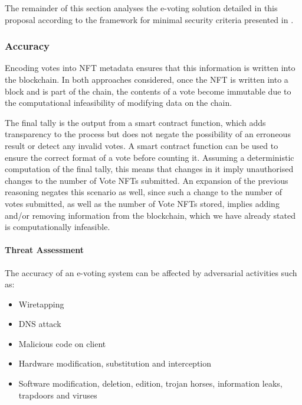 \documentclass[../main.tex]{subfiles}
\begin{document}
        The remainder of this section analyses the e-voting solution detailed in this proposal according to the framework for minimal security criteria presented in \cite{Almeida2023}.

        \subsubsection{Accuracy}
            Encoding votes into NFT metadata ensures that this information is written into the blockchain. In both approaches considered, once the NFT is written into a block and is part of the chain, the contents of a vote become immutable due to the computational infeasibility of modifying data on the chain.
            \par
            The final tally is the output from a smart contract function, which adds transparency to the process but does not negate the possibility of an erroneous result or detect any invalid votes. A smart contract function can be used to ensure the correct format of a vote before counting it. Assuming a deterministic computation of the final tally, this means that changes in it imply unauthorised changes to the number of Vote NFTs submitted. An expansion of the previous reasoning negates this scenario as well, since such a change to the number of votes submitted, as well as the number of Vote NFTs stored, implies adding and/or removing information from the blockchain, which we have already stated is computationally infeasible.
                
                \paragraph{Threat Assessment}
                The accuracy of an e-voting system can be affected by adversarial activities such as:
                \begin{itemize}
                    \item{Wiretapping}
                    \item{DNS attack}
                    \item{Malicious code on client}
                    \item{Hardware modification, substitution and interception}
                    \item{Software modification, deletion, edition, trojan horses, information leaks, trapdoors and viruses}
                \end{itemize}
\end{document}
